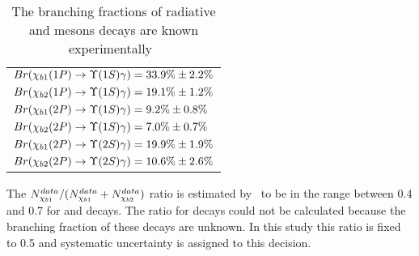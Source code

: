 \begin{table}[H]
\caption{The branching fractions of radiative \chibOneP and \chibTwoP mesons
decays are known experimentally~\cite{PDG2012}}
\centering
\begin{tabular}{l}
$Br(\chiboneOneP \to \Y1S \gamma) = 33.9\% \pm 2.2\%$ \\
$Br(\chibtwoOneP \to \Y1S \gamma) = 19.1\% \pm 1.2\%$ \\
$Br(\chiboneTwoP \to \Y1S \gamma) = 9.2\% \pm 0.8\%$ \\
$Br(\chibtwoTwoP \to \Y1S \gamma)  = 7.0\% \pm 0.7\%$ \\
$Br(\chiboneTwoP \to \Y2S \gamma) = 19.9\% \pm 1.9\%$ \\
$Br(\chibtwoTwoP \to \Y2S \gamma) = 10.6\% \pm 2.6\%$ \\
\end{tabular}
\label{tab:branching}
\end{table}

The $N_{\chi_{b 1}}^{data}/(N_{\chi_{b 1}}^{data} + N_{\chi_{b 2}}^{data})$ ratio is
estimated by~ to be in the range between 0.4 and 0.7 for
\chibOneP and \chibTwoP decays. The ratio for \chibThreeP decays could not be
calculated because the branching fraction of these decays are unknown. In this
study this ratio is fixed to 0.5 and systematic uncertainty is assigned to this
decision. 

% 
